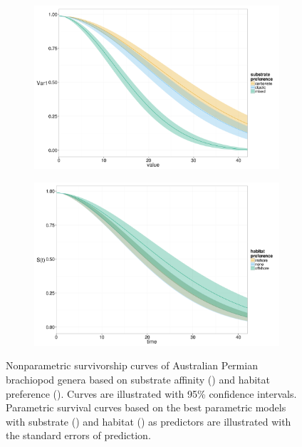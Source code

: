 \documentclass[12pt,letterpaper]{article}
\begin{document}
\begin{figure}[ht]
  \begin{subfigure}[b]{0.5\textwidth}
    \caption{}
    \includegraphics[height = 0.4\textheight, width = \textwidth, keepaspectratio = true]{figure/aff}
    \label{subfig:aff_surv}
  \end{subfigure}
  \begin{subfigure}[b]{0.5\textwidth}
    \caption{}
    \includegraphics[height = 0.4\textheight, width = \textwidth, keepaspectratio = true]{figure/hab}
    \label{subfig:env_surv}
  \end{subfigure}
  \caption[Brachiopod survival curves]{Nonparametric survivorship curves of Australian Permian brachiopod genera based on substrate affinity () and habitat preference (). Curves are illustrated with 95\% confidence intervals. Parametric survival curves based on the best parametric models with substrate () and habitat () as predictors are illustrated with the standard errors of prediction.} 
  \label{fig:brach_surv}
\end{figure}
\end{document}
